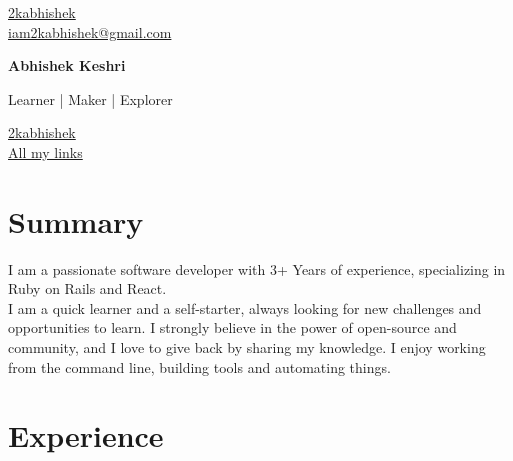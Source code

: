 \documentclass[11pt]{article} %
\begin{document}
\begin{multicols}{3}
  \begin{flushleft}
    \color{gray}{\faGithub} \href{https://github.com/2kabhishek}{2kabhishek} \\
    \color{gray}{\faEnvelope} \href{mailto:iam2kabhishek@gmail.com}{iam2kabhishek@gmail.com} \\
  \end{flushleft}

\columnbreak

  \begin{center}
      {\huge\bfseries Abhishek Keshri} \par
      Learner | Maker | Explorer \par
  \end{center}

\columnbreak

  \begin{flushright}
    \href{https://linkedin.com/in/2kabhishek/}{2kabhishek} {\color{gray}{\faLinkedin}} \\
    \href{https://2kabhishek.github.io/links}{All my links} {\textcolor{gray}{\faLink}} \\
  \end{flushright}
\end{multicols}

\section{Summary}
I am a passionate software developer with 3+ Years of experience, specializing in Ruby on Rails and React. \\
I am a quick learner and a self-starter, always looking for new challenges and opportunities to learn.
I strongly believe in the power of open-source and community, and I love to give back by sharing my knowledge.
I enjoy working from the command line, building tools and automating things.

\section{Experience}
\end{document}
